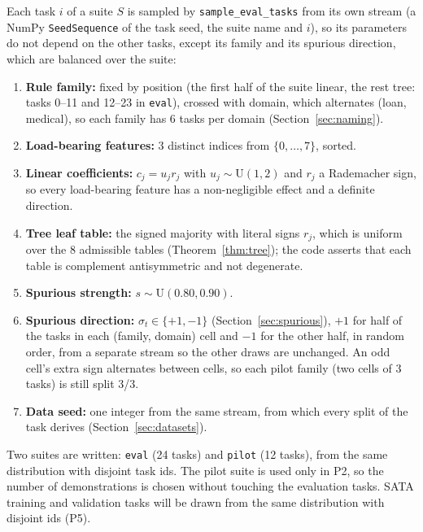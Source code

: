 \documentclass[11pt,a4paper]{article}
\newcommand{\1}{\mathbf{1}}
\theoremstyle{plain}
\theoremstyle{definition}
\theoremstyle{remark}
\begin{document}
Each task $i$ of a suite $S$ is sampled by \texttt{sample\_eval\_tasks}
from its own stream (a NumPy \texttt{SeedSequence} of the task seed, the
suite name and $i$), so its parameters do not depend on the other tasks,
except its family and its spurious direction, which are balanced over the
suite:
\begin{enumerate}[nosep]
  \item \textbf{Rule family:} fixed by position (the first half of the suite
        linear, the rest tree: tasks 0--11 and 12--23 in \texttt{eval}),
        crossed with domain, which alternates (loan, medical), so each family
        has 6 tasks per domain (Section~\ref{sec:naming}).
  \item \textbf{Load-bearing features:} 3 distinct indices from
        $\{0,\ldots,7\}$, sorted.
  \item \textbf{Linear coefficients:} $c_j = u_j r_j$ with
        $u_j \sim \text{U}(1,2)$ and $r_j$ a Rademacher sign, so every
        load-bearing feature has a non-negligible effect and a definite
        direction.
  \item \textbf{Tree leaf table:} the signed majority with literal signs
        $r_j$, which is uniform over the 8 admissible tables
        (Theorem~\ref{thm:tree}); the code asserts that each table is
        complement antisymmetric and not degenerate.
  \item \textbf{Spurious strength:} $s \sim \text{U}(0.80, 0.90)$.
  \item \textbf{Spurious direction:} $\sigma_t \in \{+1, -1\}$
        (Section~\ref{sec:spurious}), $+1$ for half of the tasks in each
        (family, domain) cell and $-1$ for the other half, in random order,
        from a separate stream so the other draws are unchanged. An odd
        cell's extra sign alternates between cells, so each pilot family (two
        cells of 3 tasks) is still split 3/3.
  \item \textbf{Data seed:} one integer from the same stream, from which
        every split of the task derives (Section~\ref{sec:datasets}).
\end{enumerate}
Two suites are written: \texttt{eval} (24 tasks) and \texttt{pilot}
(12 tasks), from the same distribution with disjoint task ids. The pilot
suite is used only in P2, so the number of demonstrations is chosen without
touching the evaluation tasks. SATA training and validation tasks will be
drawn from the same distribution with disjoint ids (P5).

\end{document}
